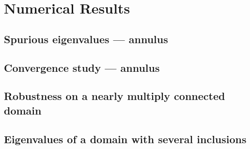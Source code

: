 \section{Numerical Results}
\label{sec:numerical}

\subsection{Spurious eigenvalues --- annulus}
\label{subsec:spurannulus}
  
\subsection{Convergence study --- annulus}
\label{subsec:convannulus}

\subsection{Robustness on a nearly multiply connected domain}
\label{subsec:crescent}

\subsection{Eigenvalues of a domain with several inclusions}
